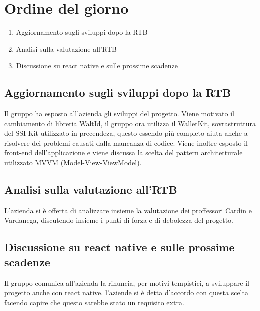 \section{Ordine del giorno}
\begin{enumerate}
\item Aggiornamento sugli sviluppi dopo la RTB
\item Analisi sulla valutazione all'RTB
\item Discussione su react native e sulle prossime scadenze
\end{enumerate}

\subsection{Aggiornamento sugli sviluppi dopo la RTB} 
Il gruppo ha esposto all'azienda gli sviluppi del progetto. Viene motivato il cambiamento di libreria WaltId, il gruppo ora utilizza il WalletKit, sovrastruttura del SSI Kit utilizzato in precendeza, questo essendo più completo aiuta anche a risolvere dei problemi causati dalla mancanza di codice.
Viene inoltre esposto il front-end dell'applicazione e viene discussa la scelta del pattern architetturale utilizzato MVVM (Model-View-ViewModel).

\subsection{Analisi sulla valutazione all'RTB}
L'azienda si è offerta di analizzare insieme la valutazione dei proffessori Cardin e Vardanega, discutendo insieme i punti di forza e di debolezza del progetto.

\subsection{Discussione su react native e sulle prossime scadenze}
Il gruppo comunica all'azienda la rinuncia, per motivi tempistici, a sviluppare il progetto anche con react native. l'aziende si è detta d'accordo con questa scelta facendo capire che questo sarebbe stato un requisito extra.
